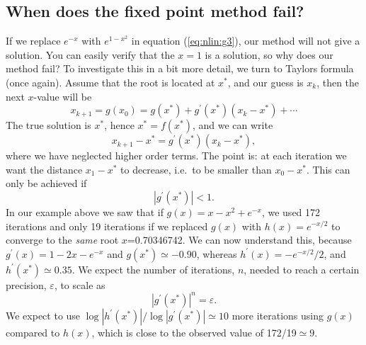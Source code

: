 \documentclass[graybox,sectrefs,envcountresetchap,open=right,final]{svmonodo}
\begin{document}

\subsection{When does the fixed point method fail?}
\label{sec:nlin:fp}
If we replace $e^{-x}$ with $e^{1-x^2}$ in equation (\ref{eq:nlin:g3}), our method will not give a solution. You can easily verify that the $x=1$ is a solution, so why does our method fail? To investigate this in a bit more detail, we turn to Taylors formula (once again). Assume that the root is located at $x^*$, and our guess is $x_k$, then the next $x$-value will be
\begin{equation}
x_{k+1}=g(x_0)=g(x^*)+g^\prime(x^*)(x_k-x^*)+\cdots
\label{eq:nlin:t1}
\end{equation}
The true solution is $x^*$, hence $x^*=f(x^*)$, and we can write
\begin{equation}
x_{k+1}-x^*=g^\prime(x^*)(x_k-x^*),
\label{eq:nlin:t2}
\end{equation}
where we have neglected higher order terms. The point is: at each iteration we want the distance $x_1-x^*$ to decrease, i.e.~to be smaller than $x_0-x^*$. This can only be achieved if
\begin{equation}
|g^\prime(x^*)|<1. 
\label{eq:nlin:fpi}
\end{equation}
In our example above we saw that if $g(x)=x-x^2+e^{-x}$, we used 172 iterations and only 19 iterations if we replaced $g(x)$ with $h(x)=e^{-x/2}$ to converge to the \emph{same} root $x$=0.70346742. We can now understand this, because $g^\prime(x)=1-2x-e^{-x}$ and $g(x^*)\simeq-0.90$, whereas $h^\prime(x)=-e^{-x/2}/2$, and $h^\prime(x^*)\simeq0.35$. We expect the number of iterations, $n$, needed to reach a certain precision, $\varepsilon$, to scale as
\begin{equation}
|g^\prime(x^*)|^n=\varepsilon.
\label{eq:nlin:scale}
\end{equation}
We expect to use $\log|h^\prime(x^*)|/\log|g^\prime(x^*)|\simeq10$ more iterations using $g(x)$ compared to $h(x)$, which is close to the observed value of 172/19$\simeq 9$.
\end{document}
